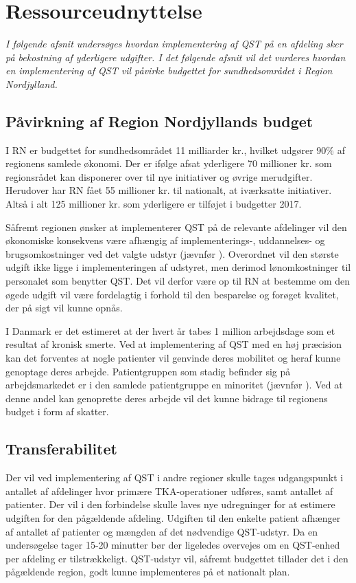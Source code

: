 \section{Ressourceudnyttelse}
\textit{I følgende afsnit undersøges hvordan implementering af QST på en afdeling sker på bekostning af yderligere udgifter. I det følgende afsnit vil det vurderes hvordan en implementering af QST vil påvirke budgettet for sundhedsområdet i Region Nordjylland.}

\subsection{Påvirkning af Region Nordjyllands budget}
I RN er budgettet for sundhedsområdet 11 milliarder kr., hvilket udgører 90\% af regionens samlede økonomi. \citep{RnBudget17}  Der er ifølge  afsat yderligere 70 millioner kr. som regionsrådet kan disponerer over til nye initiativer og øvrige merudgifter. Herudover har RN fået 55 millioner kr. til nationalt, at iværksatte initiativer. Altså i alt 125 millioner kr. som yderligere er tilføjet i budgetter 2017.

Såfremt regionen ønsker at implementerer QST på de relevante afdelinger vil den økonomiske konsekvens være afhængig af implementerings-, uddannelses- og brugsomkostninger ved det valgte udstyr (jævnfør ). Overordnet vil den største udgift ikke ligge i implementeringen af udstyret, men derimod lønomkostninger til personalet som benytter QST. Det vil derfor være op til RN at bestemme om den øgede udgift vil være fordelagtig i forhold til den besparelse og forøget kvalitet, der på sigt vil kunne opnås. 

I Danmark er det estimeret at der hvert år tabes 1 million arbejdsdage som et resultat af kronisk smerte. \citep{Eriksen2006} Ved at implementering af QST med en høj præcision kan det forventes at nogle patienter vil genvinde deres mobilitet og heraf kunne genoptage deres arbejde. Patientgruppen som stadig befinder sig på arbejdsmarkedet er i den samlede patientgruppe en minoritet (jævnfør ). Ved at denne andel kan genoprette deres arbejde vil det kunne bidrage til regionens budget i form af skatter.

\subsection{Transferabilitet}
Der vil ved implementering af QST i andre regioner skulle tages udgangspunkt i antallet af afdelinger hvor primære TKA-operationer udføres, samt antallet af patienter. Der vil i den forbindelse skulle laves nye udregninger for at estimere udgiften for den pågældende afdeling. Udgiften til den enkelte patient afhænger af antallet af patienter og mængden af det nødvendige QST-udstyr. Da en undersøgelse tager 15-20 minutter bør der ligeledes overvejes om en QST-enhed per afdeling er tilstrækkeligt. QST-udstyr vil, såfremt budgettet tillader det i den pågældende region, godt kunne implementeres på et nationalt plan.

